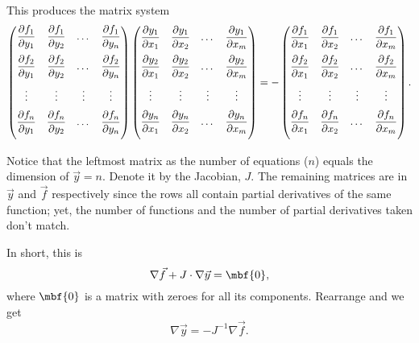 \documentclass[a4paper, 12pt,oneside,openany]{book}
\begin{document}
This produces the matrix system $$\begin{pmatrix} \medskip \dfrac{\partial f_1}{\partial y_1} & \dfrac{\partial f_1}{\partial y_2} & \dots & \dfrac{\partial f_1}{\partial y_n} \\ \medskip \dfrac{\partial f_2}{\partial y_1} & \dfrac{\partial f_2}{\partial y_2} & \dots & \dfrac{\partial f_2}{\partial y_n} \\ \medskip \vdots & \vdots & \vdots & \vdots \\ \medskip \dfrac{\partial f_n}{\partial y_1} & \dfrac{\partial f_n}{\partial y_2} & \dots & \dfrac{\partial f_n}{\partial y_n} \end{pmatrix} \begin{pmatrix} \medskip \dfrac{\partial y_1}{\partial x_1} & \dfrac{\partial y_1}{\partial x_2} & \dots & \dfrac{\partial y_1}{\partial x_m} \\ \medskip \dfrac{\partial y_2}{\partial x_1} & \dfrac{\partial y_2}{\partial x_2} & \dots & \dfrac{\partial y_2}{\partial x_m} \\ \medskip \vdots & \vdots & \vdots & \vdots \\ \medskip \dfrac{\partial y_n}{\partial x_1} & \dfrac{\partial y_n}{\partial x_2} & \dots & \dfrac{\partial y_n}{\partial x_m} \end{pmatrix} = -\begin{pmatrix} \medskip \dfrac{\partial f_1}{\partial x_1} & \dfrac{\partial f_1}{\partial x_2} & \dots & \dfrac{\partial f_1}{\partial x_m} \\ \medskip \dfrac{\partial f_2}{\partial x_1} & \dfrac{\partial f_2}{\partial x_2} & \dots & \dfrac{\partial f_2}{\partial x_m} \\ \medskip \vdots & \vdots & \vdots & \vdots \\ \medskip \dfrac{\partial f_n}{\partial x_1} & \dfrac{\partial f_n}{\partial x_2} & \dots & \dfrac{\partial f_n}{\partial x_m} \end{pmatrix}.$$

Notice that the leftmost matrix  as the number of equations ($n$) equals the dimension of $\vec{y}=n$. Denote it by the Jacobian, $J$. The remaining matrices are  in $\vec{y}$ and $\vec{f}$ respectively since the rows all contain partial derivatives of the same function; yet, the number of functions and the number of partial derivatives taken don't match. 

In short, this is $$\nabla \vec{f} + J \cdot \nabla \vec{y} = \mbf{0},$$ where $\mbf{0}$ is a matrix with zeroes for all its components. Rearrange and we get $$\nabla \vec{y} = -J^{-1} \nabla \vec{f}.$$
\end{document}
